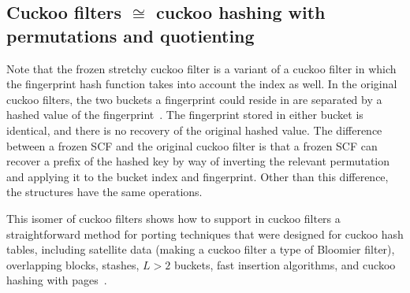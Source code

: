 \documentclass[letterpaper,twocolumn,10pt]{article}
\newcommand{\etal}{et al.}
\newcommand{\taffy}{stretchy}
\newcommand{\TCF}{SCF}
\newcommand{\taffy}{taffy}
\newcommand{\TCF}{TCF}
\begin{document}
\subsection{Cuckoo filters $\cong$ cuckoo hashing with permutations and quotienting}
\label{dictionary}

Note that the frozen \taffy{} cuckoo filter is a variant of a cuckoo filter in which the fingerprint hash function takes into account the index as well.
In the original cuckoo filters, the two buckets a fingerprint could reside in are separated by a hashed value of the fingerprint~\cite{cuckoo}.
The fingerprint stored in either bucket is identical, and there is no recovery of the original hashed value.
The difference between a frozen \TCF{} and the original cuckoo filter is that a frozen \TCF{} can recover a prefix of the hashed key by way of inverting the relevant permutation and applying it to the bucket index and fingerprint.
Other than this difference, the structures have the same operations.

This isomer of cuckoo filters shows how to support in cuckoo filters a straightforward method for porting techniques that were designed for cuckoo hash tables, including satellite data (making a cuckoo filter a type of Bloomier filter), overlapping blocks, stashes, $L > 2$ buckets, fast insertion algorithms, and cuckoo hashing with pages~\cite{cuckoo-simple,cuckoo-overlap,stash,d-ary,d-ary-filter,vertical,bloomier,cuckoo-linear-insertion,cuckoo-simd-insert,cuckoo-pages,cuckoo-pages-non-contiguous}.



\end{document}
